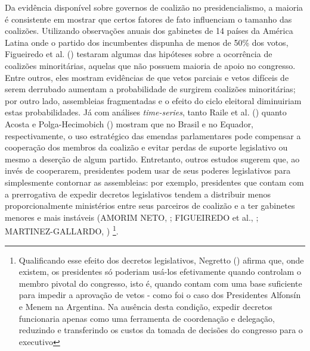 Da evidência disponível sobre governos de coalizão no presidencialismo, a maioria é consistente em mostrar que certos fatores de fato influenciam o tamanho das coalizões. Utilizando observações anuais dos gabinetes de 14 países da América Latina onde o partido dos incumbentes dispunha de menos de 50\% dos votos, Figueiredo et al. (\citeyear{figueiredo2012}) testaram algumas das hipóteses sobre a ocorrência de coalizões minoritárias, aquelas que não possuem maioria de apoio no congresso. Entre outros, eles mostram evidências de que vetos parciais e vetos difíceis de serem derrubado aumentam a probabilidade de surgirem coalizões minoritárias; por outro lado, assembleias fragmentadas e o efeito do ciclo eleitoral diminuiriam estas probabilidades. Já com análises \textit{time-series}, tanto Raile et al. (\citeyear{raile2010}) quanto Acosta e Polga-Hecimobich (\citeyear{acosta2011}) mostram que no Brasil e no Equador, respectivamente, o uso estratégico das emendas parlamentares pode compensar a cooperação dos membros da coalizão e evitar perdas de suporte legislativo ou mesmo a deserção de algum partido. Entretanto, outros estudos sugerem que, ao invés de cooperarem, presidentes podem usar de seus poderes legislativos para simplesmente contornar as assembleias: por exemplo, presidentes que contam com a prerrogativa de expedir decretos legislativos tendem a distribuir menos proporcionalmente ministérios entre seus parceiros de coalizão e a ter gabinetes menores e mais instáveis (AMORIM NETO, \citeyear{neto2006}; FIGUEIREDO et al., \citeyear{figueiredo2012}; MARTINEZ-GALLARDO, \citeyear{martinez2012}) \footnote{Qualificando esse efeito dos decretos legislativos, Negretto (\citeyear{negretto2004}) afirma que, onde existem, os presidentes só poderiam usá-los efetivamente quando controlam o membro pivotal do congresso, isto é, quando contam com uma base suficiente para impedir a aprovação de vetos - como foi o caso dos Presidentes Alfonsín e Menem na Argentina. Na ausência desta condição, expedir decretos funcionaria apenas como uma ferramenta de coordenação e delegação, reduzindo e transferindo os custos da tomada de decisões do congresso para o executivo}.
 
